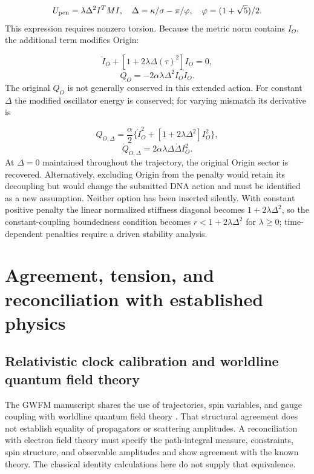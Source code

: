 \documentclass[aip,adv,preprint,floatfix]{revtex4-2}
\begin{document}
\begin{equation}
U_{\rm pen}=\lambda\Delta^2 I^TMI,\quad \Delta=\kappa/\sigma-\pi/\varphi,\quad \varphi=(1+\sqrt5)/2.
\end{equation}
This expression requires nonzero torsion. Because the metric norm contains $I_O$, the additional term modifies Origin:

\begin{equation}
\ddot I_O+[1+2\lambda\Delta(\tau)^2]I_O=0,
\end{equation}
\begin{equation}
\dot Q_O=-2\alpha\lambda\Delta^2 I_O\dot I_O.
\end{equation}
The original $Q_O$ is not generally conserved in this extended action. For constant $\Delta$ the modified oscillator energy is conserved; for varying mismatch its derivative is

\begin{equation}
Q_{O,\Delta}=\frac{\alpha}{2}\{\dot I_O^2+[1+2\lambda\Delta^2]I_O^2\},
\end{equation}
\begin{equation}
\dot Q_{O,\Delta}=2\alpha\lambda\Delta\dot\Delta I_O^2.
\end{equation}
At $\Delta=0$ maintained throughout the trajectory, the original Origin sector is recovered. Alternatively, excluding Origin from the penalty would retain its decoupling but would change the submitted DNA action and must be identified as a new assumption. Neither option has been inserted silently. With constant positive penalty the linear normalized stiffness diagonal becomes $1+2\lambda\Delta^2$, so the constant-coupling boundedness condition becomes $r<1+2\lambda\Delta^2$ for $\lambda\geq0$; time-dependent penalties require a driven stability analysis.

\section{Agreement, tension, and reconciliation with established physics}
\subsection*{Relativistic clock calibration and worldline quantum field theory}
The GWFM manuscript \cite{r1} shares the use of trajectories, spin variables, and gauge coupling with worldline quantum field theory \cite{r13}. That structural agreement does not establish equality of propagators or scattering amplitudes. A reconciliation with electron field theory must specify the path-integral measure, constraints, spin structure, and observable amplitudes and show agreement with the known theory. The classical identity calculations here do not supply that equivalence.
\end{document}
